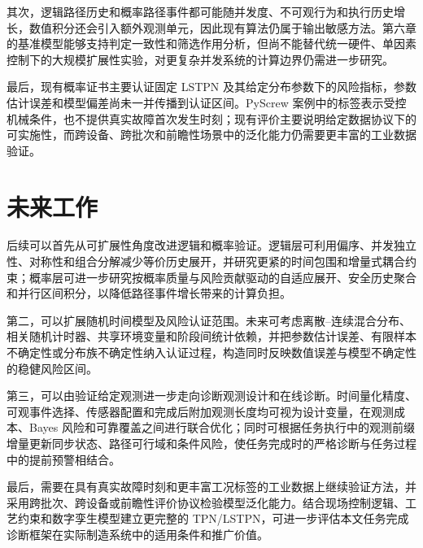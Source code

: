 \documentclass[master,fontset=ubuntu]{shnuthesis}
\theoremstyle{definition}
\begin{document}
其次，逻辑路径历史和概率路径事件都可能随并发度、不可观行为和执行历史增长，数值积分还会引入额外观测单元，因此现有算法仍属于输出敏感方法。第六章的基准模型能够支持判定一致性和筛选作用分析，但尚不能替代统一硬件、单因素控制下的大规模扩展性实验，对更复杂并发系统的计算边界仍需进一步研究。

最后，现有概率证书主要认证固定 LSTPN 及其给定分布参数下的风险指标，参数估计误差和模型偏差尚未一并传播到认证区间。PyScrew 案例中的标签表示受控机械条件，也不提供真实故障首次发生时刻；现有评价主要说明给定数据协议下的可实施性，而跨设备、跨批次和前瞻性场景中的泛化能力仍需要更丰富的工业数据验证。

\section{未来工作}

后续可以首先从可扩展性角度改进逻辑和概率验证。逻辑层可利用偏序、并发独立性、对称性和组合分解减少等价历史展开，并研究更紧的时间包围和增量式耦合约束；概率层可进一步研究按概率质量与风险贡献驱动的自适应展开、安全历史聚合和并行区间积分，以降低路径事件增长带来的计算负担。

第二，可以扩展随机时间模型及风险认证范围。未来可考虑离散--连续混合分布、相关随机计时器、共享环境变量和阶段间统计依赖，并把参数估计误差、有限样本不确定性或分布族不确定性纳入认证过程，构造同时反映数值误差与模型不确定性的稳健风险区间。

第三，可以由验证给定观测进一步走向诊断观测设计和在线诊断。时间量化精度、可观事件选择、传感器配置和完成后附加观测长度均可视为设计变量，在观测成本、Bayes 风险和可靠覆盖之间进行联合优化；同时可根据任务执行中的观测前缀增量更新同步状态、路径可行域和条件风险，使任务完成时的严格诊断与任务过程中的提前预警相结合。

最后，需要在具有真实故障时刻和更丰富工况标签的工业数据上继续验证方法，并采用跨批次、跨设备或前瞻性评价协议检验模型泛化能力。结合现场控制逻辑、工艺约束和数字孪生模型建立更完整的 TPN/LSTPN，可进一步评估本文任务完成诊断框架在实际制造系统中的适用条件和推广价值。






%
\end{document}
